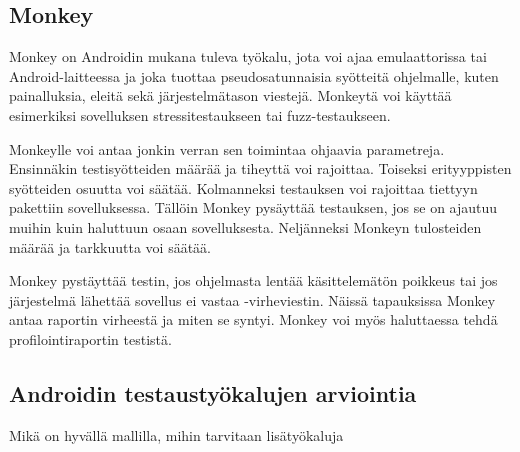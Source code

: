 \subsection{Monkey}

Monkey on Androidin mukana tuleva työkalu, jota voi ajaa emulaattorissa tai Android-laitteessa ja joka tuottaa pseudosatunnaisia syötteitä ohjelmalle, kuten painalluksia, eleitä sekä järjestelmätason viestejä. Monkeytä voi käyttää esimerkiksi sovelluksen stressitestaukseen tai fuzz-testaukseen.

Monkeylle voi antaa jonkin verran sen toimintaa ohjaavia parametreja. Ensinnäkin testisyötteiden määrää ja tiheyttä voi rajoittaa. Toiseksi erityyppisten syötteiden osuutta voi säätää. Kolmanneksi testauksen voi rajoittaa tiettyyn pakettiin sovelluksessa. Tällöin Monkey pysäyttää testauksen, jos se on ajautuu muihin kuin haluttuun osaan sovelluksesta. Neljänneksi Monkeyn tulosteiden määrää ja tarkkuutta voi säätää.

Monkey pystäyttää testin, jos ohjelmasta lentää käsittelemätön poikkeus tai jos järjestelmä lähettää sovellus ei vastaa -virheviestin. Näissä tapauksissa Monkey antaa raportin virheestä ja miten se syntyi. Monkey voi myös haluttaessa tehdä profilointiraportin testistä.\cite{android}

\subsection{Androidin testaustyökalujen arviointia}

Mikä on hyvällä mallilla, mihin tarvitaan lisätyökaluja